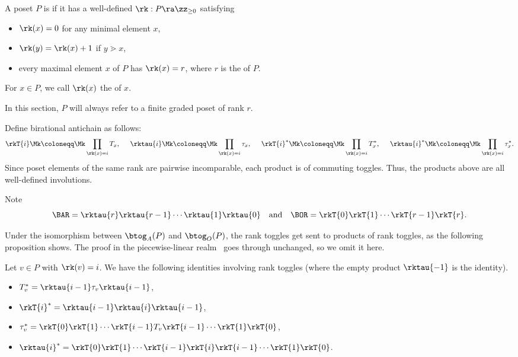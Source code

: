 \begin{defi}[\cite{ec1ed2}]
A poset $P$ is  if it has a well-defined  $\rk: P\ra \zz_{\geq 0}$ satisfying \begin{itemize}
\item $\rk(x)=0$ for any minimal element $x$,
\item $\rk(y)=\rk(x)+1$ if $y\gtrdot x$,
\item every maximal element $x$ of $P$ has $\rk(x)=r$, where $r$ is the  of $P$.
\end{itemize}
For $x\in P$, we call $\rk(x)$ the  of $x$.
\end{defi}

In this section, $P$ will always refer to a finite graded poset of rank $r$.

\begin{defi}
Define birational antichain  as follows: 
\[
\rkT{i} \Mk \coloneqq \Mk \prod\limits_{\rk(x)=i} T_x,\hspace{0.194 in}\rktau{i}
\Mk \coloneqq \Mk \prod\limits_{\rk(x)=i} \tau_x,\hspace{0.194 in}\rkT{i}^*
\Mk \coloneqq \Mk \prod\limits_{\rk(x)=i} T_x^*,\hspace{0.194in}\rktau{i}^*
\Mk \coloneqq \Mk \prod\limits_{\rk(x)=i} \tau_x^*.
\] 
Since poset elements of the same rank are pairwise incomparable, each product is of commuting toggles.
Thus, the products above are all well-defined involutions.
\end{defi}

Note 
\[
\BAR=\rktau{r}\rktau{r-1}\cdots \rktau{1}\rktau{0}
\quad 
\text{and} \quad 
\BOR = \rkT{0} \rkT{1} \cdots \rkT{r-1} \rkT{r}.
\]

Under the isomorphism between $\btog_A(P)$ and $\btog_O(P)$, the rank toggles get sent to products of rank toggles, as the following proposition shows.
The proof in the piecewise-linear realm~\cite[Propositions~2.30,~2.31]{antichain-toggling}
goes through unchanged, so we omit it here. 

\begin{prop}
Let $v\in P$ with $\rk(v)=i$.
We have the following identities involving rank toggles
(where the empty product $\rktau{-1}$ is the identity). 
\begin{itemize}
 \item $T_v^*=\rktau{i-1}\tau_v\rktau{i-1}$,
 \item $\rkT{i}^*=
\rktau{i-1}\rktau{i}\rktau{i-1}$,
 \item $\tau_v^*=\rkT{0}\rkT{1}\cdots \rkT{i-1} T_v \rkT{i-1}\cdots \rkT{1}\rkT{0}$,
 \item $\rktau{i}^*=\rkT{0}\rkT{1}\cdots \rkT{i-1}\rkT{i}\rkT{i-1}\cdots \rkT{1}\rkT{0}$.
\end{itemize}
\end{prop}

